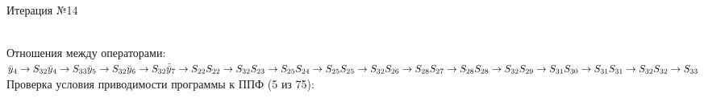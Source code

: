 \documentclass[a4paper,14pt]{article}
\begin{document}
\newpage \\ 
\begin{center}\huge Итерация №14 \end{center}\\
Отношения между операторами: \\ \newline
\begin{math}
    \bar{y}_{4} \rightarrow S_{32} \\ 
\bar{y}_{4} \rightarrow S_{33} \\ 
\bar{y}_{5} \rightarrow S_{32} \\ 
\bar{y}_{6} \rightarrow S_{32} \\ 
\bar{\bar{y}}_{7} \rightarrow S_{22} \\ 
S_{22} \rightarrow S_{32} \\ 
S_{23} \rightarrow S_{25} \\ 
S_{24} \rightarrow S_{25} \\ 
S_{25} \rightarrow S_{32} \\ 
S_{26} \rightarrow S_{28} \\ 
S_{27} \rightarrow S_{28} \\ 
S_{28} \rightarrow S_{32} \\ 
S_{29} \rightarrow S_{31} \\ 
S_{30} \rightarrow S_{31} \\ 
S_{31} \rightarrow S_{32} \\ 
S_{32} \rightarrow S_{33}
\end{math}\\ \newline
%
Проверка условия приводимости программы к ППФ (5 из 75): \\
\end{document}
